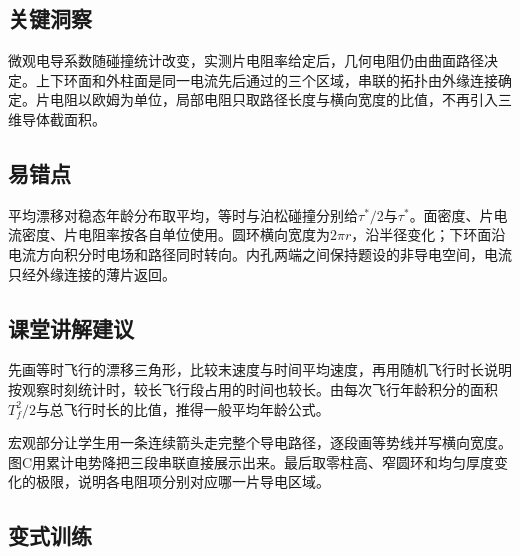 \documentclass[UTF8,fontset=fandol,a4paper,11pt]{ctexart}
\begin{document}


\subsection*{关键洞察}

微观电导系数随碰撞统计改变，实测片电阻率给定后，几何电阻仍由曲面路径决定。上下环面和外柱面是同一电流先后通过的三个区域，串联的拓扑由外缘连接确定。片电阻以欧姆为单位，局部电阻只取路径长度与横向宽度的比值，不再引入三维导体截面积。



\subsection*{易错点}

平均漂移对稳态年龄分布取平均，等时与泊松碰撞分别给$\tau^*/2$与$\tau^*$。面密度、片电流密度、片电阻率按各自单位使用。圆环横向宽度为$2\pi r$，沿半径变化；下环面沿电流方向积分时电场和路径同时转向。内孔两端之间保持题设的非导电空间，电流只经外缘连接的薄片返回。



\subsection*{课堂讲解建议}

先画等时飞行的漂移三角形，比较末速度与时间平均速度，再用随机飞行时长说明按观察时刻统计时，较长飞行段占用的时间也较长。由每次飞行年龄积分的面积$T_f^2/2$与总飞行时长的比值，推得一般平均年龄公式。

宏观部分让学生用一条连续箭头走完整个导电路径，逐段画等势线并写横向宽度。图C用累计电势降把三段串联直接展示出来。最后取零柱高、窄圆环和均匀厚度变化的极限，说明各电阻项分别对应哪一片导电区域。



\subsection*{变式训练}
\end{document}
